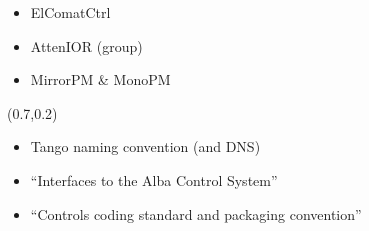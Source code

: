 \documentclass{beamer}
\begin{document}
\begin{frame}
\begin{textblock*}{45mm}
\begin{itemize}
\begin{itemize}
                \item ElComatCtrl
                \item AttenIOR (group)
                \item MirrorPM \& MonoPM
            \end{itemize}
        \end{itemize}
    \end{textblock*}
    \begin{textblock*}{55mm}(0.7\textwidth,0.2\textheight)
        \begin{itemize}
            \item Tango naming convention (and DNS)
            \item ``Interfaces to the Alba Control System''
            \item<alert@1> ``Controls coding standard and packaging convention''
        \end{itemize}
    \end{textblock*}
\end{frame}
\end{document}
